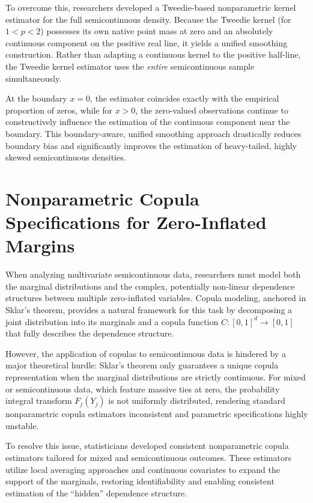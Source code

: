 \documentclass[11pt, a4paper]{article}
\begin{document}
To overcome this, researchers developed a Tweedie-based nonparametric kernel estimator for the full semicontinuous density.\cite{albert2005, kokonendji2021} Because the Tweedie kernel (for $1 < p < 2$) possesses its own native point mass at zero and an absolutely continuous component on the positive real line, it yields a unified smoothing construction.\cite{kokonendji2021} Rather than adapting a continuous kernel to the positive half-line, the Tweedie kernel estimator uses the \textit{entire} semicontinuous sample simultaneously.\cite{kokonendji2021} 

At the boundary $x = 0$, the estimator coincides exactly with the empirical proportion of zeros, while for $x > 0$, the zero-valued observations continue to constructively influence the estimation of the continuous component near the boundary.\cite{kokonendji2021} This boundary-aware, unified smoothing approach drastically reduces boundary bias and significantly improves the estimation of heavy-tailed, highly skewed semicontinuous densities.\cite{albert2005, kokonendji2021}


\section{Nonparametric Copula Specifications for Zero-Inflated Margins}

When analyzing multivariate semicontinuous data, researchers must model both the marginal distributions and the complex, potentially non-linear dependence structures between multiple zero-inflated variables.\cite{craiu2012, tooze2006, schepsmeier2016} Copula modeling, anchored in Sklar's theorem, provides a natural framework for this task by decomposing a joint distribution into its marginals and a copula function $C: [0, 1]^d \to [0, 1]$ that fully describes the dependence structure.\cite{craiu2012, sklar1959, joe2014}

However, the application of copulas to semicontinuous data is hindered by a major theoretical hurdle: Sklar's theorem only guarantees a unique copula representation when the marginal distributions are strictly continuous.\cite{craiu2012, joe2014, genest2007} For mixed or semicontinuous data, which feature massive ties at zero, the probability integral transform $F_j(Y_j)$ is not uniformly distributed, rendering standard nonparametric copula estimators inconsistent and parametric specifications highly unstable.\cite{craiu2012, joe2014, genest2007} 

To resolve this issue, statisticians developed consistent nonparametric copula estimators tailored for mixed and semicontinuous outcomes.\cite{craiu2012} These estimators utilize local averaging approaches and continuous covariates to expand the support of the marginals, restoring identifiability and enabling consistent estimation of the ``hidden'' dependence structure.\cite{craiu2012, joe2014, genest2007} 
\end{document}
